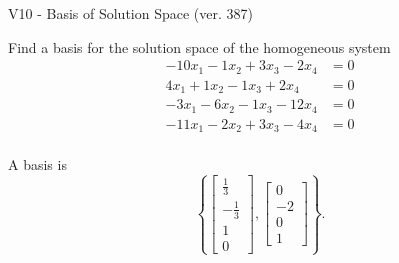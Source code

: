 \begin{exercise}
  \begin{exerciseTitle}V10 - Basis of Solution Space (ver. 387)\end{exerciseTitle}
  \begin{exerciseStatement}
    Find a basis for the solution space of the homogeneous system 
\begin{align*}
 -10 x_ 1 -1 x_ 2 + 3 x_ 3 -2 x_ 4 &= 0  \\ 
  4 x_ 1 + 1 x_ 2 -1 x_ 3 + 2 x_ 4 &= 0  \\ 
  -3 x_ 1 -6 x_ 2 -1 x_ 3 -12 x_ 4 &= 0  \\ 
  -11 x_ 1 -2 x_ 2 + 3 x_ 3 -4 x_ 4 &= 0  \\ 
 \end{align*}


 
  \end{exerciseStatement}

  \begin{exerciseAnswer}
   A basis is   
\[\left\{\left[\begin{array}{c}
\frac{1}{3} \\
-\frac{1}{3} \\
1 \\
0
\end{array}\right] , \left[\begin{array}{c}
0 \\
-2 \\
0 \\
1
\end{array}\right]\right\}.\]

  


  \end{exerciseAnswer}
\end{exercise}